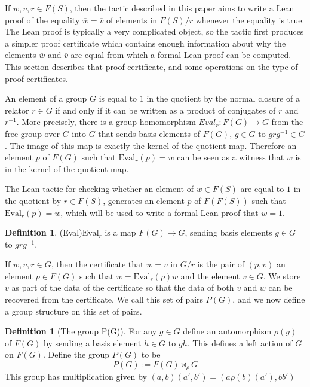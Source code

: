 \documentclass[12pt]{article} %
\theoremstyle{definition}
\theoremstyle{definition}
\theoremstyle{definition}
\theoremstyle{definition}
\newtheorem{defn}[thm]{Definition}
\begin{document}
If $w, v, r \in F(S)$, then the tactic described in this paper aims to write a
Lean proof of the equality
$\overline{w} = \overline{v}$ of elements in $F(S) / r$ whenever the equality is true.
The Lean proof is typically
a very complicated object, so the tactic first produces a simpler proof certificate which
contains enough information about why the elements $\overline{w}$ and $\overline{v}$ are equal
from which a formal Lean proof can be computed. This section describes that proof certificate,
and some operations on the type of proof certificates.

An element of a group $G$ is equal to $1$ in the quotient by the normal closure
of a relator $r \in G$ if and only if it can be written as a product of conjugates of
$r$ and $r^{-1}$.
More precisely, there is a group homomorphism $\textit{Eval}_r : F(G) \to G$ from the free group
over $G$ into $G$ that sends basis elements of $F(G)$,
$g \in G$ to $grg^{-1} \in G$. The image of this map is exactly the kernel of the quotient map.
Therefore an element $p$ of $F(G)$ such that $\text{Eval}_r(p) = w$
can be seen as a witness that $w$ is in the kernel of the quotient map.

The Lean tactic
for checking whether an element of $w \in F(S)$ are equal to $1$ in the quotient by $r \in F(S)$,
generates an element $p$ of $F(F(S))$ such that $\text{Eval}_r(p) = w$, which will be used to write
a formal Lean proof that $\overline{w} = 1$.

\begin{defn}(Eval)\label{Eval}
  $\text{Eval}_r$ is a map $F(G) \to G$, sending basis elements $g \in G$ to $grg^{-1}$.
\end{defn}

If $w, v, r \in G$, then the certificate that
$\overline{w} = \overline{v}$ in $G / r$ is the pair of $(p, v)$ an element
$p \in F(G)$ such that $w = \text{Eval}_r(p) w$ and the element $v \in G$.
We store $v$ as part of the data of the certificate so that the
data of both $v$ and $w$ can be recovered from the certificate.
We call this set of pairs $P(G)$, and we now define
a group structure on this set of pairs.

\begin{defn}[The group P(G)]
  For any $g \in G$ define an automorphism $\rho(g)$ of $F(G)$ by sending a basis
  element $h \in G$ to $gh$. This defines a left action of $G$ on $F(G)$.
  Define the group $P(G)$ to be
  \begin{equation}
  P(G) := F(G) \rtimes_{\rho} G
  \end{equation}
  This group has multiplication given by $(a, b) (a', b') = (a \rho(b)(a'), bb')$
\end{defn}
\end{document}
